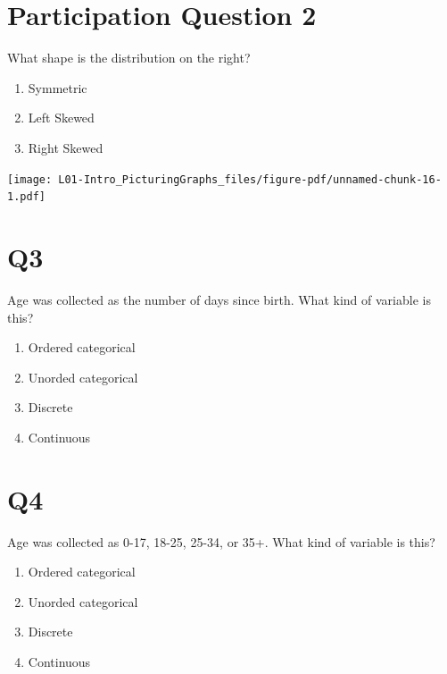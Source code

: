 \documentclass[
  letterpaper,
  DIV=11,
  numbers=noendperiod]{scrreprt}
\providecommand{\tightlist}{%
  \setlength{\itemsep}{0pt}\setlength{\parskip}{0pt}}\usepackage{longtable,booktabs,array}
\begin{document}
\hypertarget{participation-question-2}{%
\section{Participation Question 2}\label{participation-question-2}}

\vspace{0.5cm}

What shape is the distribution on the right?

\pspace

\begin{enumerate}
\def\labelenumi{\arabic{enumi}.}
\tightlist
\item
  Symmetric\lspace
\item
  Left Skewed\lspace
\item
  Right Skewed
\end{enumerate}

\texttt{[image: L01-Intro\_PicturingGraphs\_files/figure-pdf/unnamed-chunk-16-1.pdf]}

\hypertarget{q3}{%
\section{Q3}\label{q3}}

Age was collected as the number of days since birth. What kind of
variable is this?

\pspace

\begin{enumerate}
\def\labelenumi{\arabic{enumi}.}
\tightlist
\item
  Ordered categorical\lspace
\item
  Unorded categorical\lspace
\item
  Discrete\lspace
\item
  Continuous
\end{enumerate}

\hypertarget{q4}{%
\section{Q4}\label{q4}}

Age was collected as 0-17, 18-25, 25-34, or 35+. What kind of variable
is this?

\pspace

\begin{enumerate}
\def\labelenumi{\arabic{enumi}.}
\tightlist
\item
  Ordered categorical\lspace
\item
  Unorded categorical\lspace
\item
  Discrete\lspace
\item
  Continuous
\end{enumerate}
\end{document}
